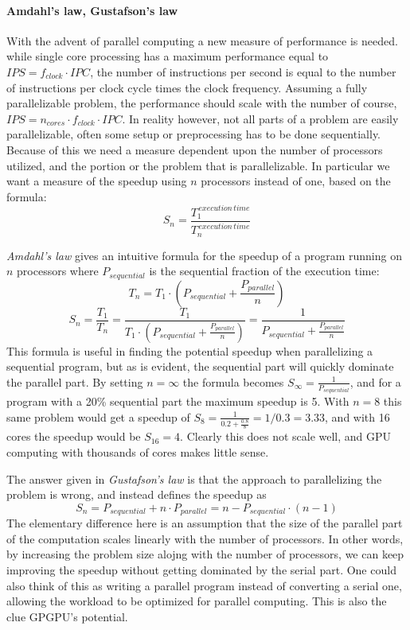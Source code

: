 \paragraph{Amdahl's law, Gustafson's law}\label{sec:background-speedup}
With the advent of parallel computing a new measure of performance is needed. while single core processing has a maximum
performance equal to $IPS = f_{clock} \cdot IPC$, the number of instructions per second is equal to the number of
instructions per clock cycle times the clock frequency. Assuming a fully parallelizable problem, the performance should
scale with the number of course, $IPS = n_{cores} \cdot f_{clock} \cdot IPC$. In reality however, not all parts of a
problem are easily parallelizable, often some setup or preprocessing has to be done sequentially. Because of this we
need a measure dependent upon the number of processors utilized, and the portion or the problem that is parallelizable.
In particular we want a measure of the speedup using $n$ processors instead of one, based on the formula:
$$S_n = \frac{T_1^{\,execution\,time}}{T_n^{\,execution\,time}}$$

\emph{Amdahl's law} gives an intuitive formula for the speedup of a program running on $n$ processors where $P_{sequential}$
is the sequential fraction of the execution time:
$$ T_n = T_1 \cdot (P_{sequential} + \frac{P_{parallel}}{n}) $$
$$ S_n = \frac{T_1}{T_n} = \frac{T_1}{T_1 \cdot (P_{sequential} + \frac{P_{parallel}}{n})} = \frac{1}{P_{sequential} + \frac{P_{parallel}}{n}}$$
This formula is useful in finding the potential speedup when parallelizing a sequential program, but as is evident, the
sequential part will quickly dominate the parallel part. By setting $n = \infty$ the formula becomes $S_\infty = \frac{1}{P_{sequential}}$,
and for a program with a 20\% sequential part the maximum speedup is 5. With $n=8$ this same problem would get a speedup
of $S_8 = \frac{1}{0.2 + \frac{0.8}{8}} = 1 / 0.3 = 3.33$, and with 16 cores the speedup would be $S_16 = 4$. Clearly
this does not scale well, and GPU computing with thousands of cores makes little sense.

The answer given in \emph{Gustafson's law} is that the approach to parallelizing the problem is wrong, and instead
defines the speedup as
$$ S_n = P_{sequential} + n \cdot P_{parallel}= n - P_{sequential} \cdot (n-1) $$
The elementary difference here is an assumption that the size of the parallel part of the computation scales linearly
with the number of processors. In other words, by increasing the problem size alojng with the number of processors, we
can keep improving the speedup without getting dominated by the serial part. One could also think of this as writing a
parallel program instead of converting a serial one, allowing the workload to be optimized for parallel computing. This
is also the clue GPGPU's potential.


